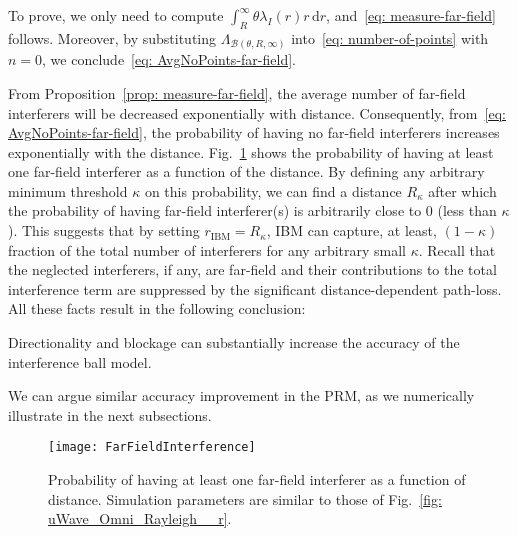 \documentclass[12pt, draftclsnofoot, onecolumn]{IEEEtran}
\begin{document}
\begin{IEEEproof}
To prove, we only need to compute $\int_{R}^{\infty}{\! \theta \lambda_I \left( r \right) r\, \mathrm{d}r}$, and~\eqref{eq: measure-far-field} follows. Moreover, by substituting $\Lambda_{\mathcal{B}(\theta,R,\infty)}$ into~\eqref{eq: number-of-points} with $n=0$, we conclude~\eqref{eq: AvgNoPoints-far-field}.
\end{IEEEproof}

From Proposition~\ref{prop: measure-far-field}, the average number of far-field interferers will be decreased exponentially with distance. Consequently, from~\eqref{eq: AvgNoPoints-far-field}, the probability of having no far-field interferers increases exponentially with the distance. Fig.~\ref{fig: FarFieldInterference} shows the probability of having at least one far-field interferer as a function of the distance. By defining any arbitrary minimum threshold $\kappa$ on this probability, we can find a distance $R_{\kappa}$ after which the probability of having far-field interferer(s) is arbitrarily close to 0 (less than $\kappa$). This suggests that by setting $r_{\mathrm{IBM}} = R_{\kappa}$, IBM can capture, at least, $(1-\kappa)$ fraction of the total number of interferers for any arbitrary small $\kappa$. Recall that the neglected interferers, if any, are far-field and their contributions to the total interference term are suppressed by the significant distance-dependent path-loss. All these facts result in the following conclusion:
\begin{result}\label{result: 6}
Directionality and blockage can substantially increase the accuracy of the interference ball model.
\end{result}
We can argue similar accuracy improvement in the PRM, as we numerically illustrate in the next subsections.



\begin{figure}[!t]
  \centering
  \texttt{[image: FarFieldInterference]}\\

  \caption{Probability of having at least one far-field interferer as a function of distance. Simulation parameters are similar to those of Fig.~\ref{fig: uWave_Omni_Rayleigh__r}.}
  \label{fig: FarFieldInterference}
\vspace{-7mm}
\end{figure}
\end{document}

